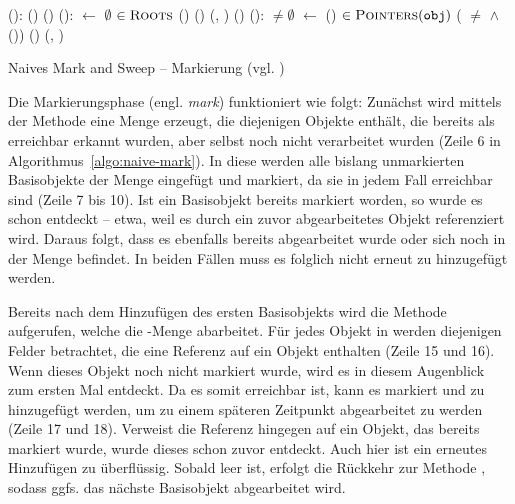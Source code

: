 \begin{algorithm}
\begin{algorithmic}[1]
	\State {}():
	\State \quad {}()
	\State \quad {}()
	\State
	\State {}():
	\State \quad {} $\gets$ $\emptyset$				
	\State \quad \FOREACH {} $\in \textsc{Roots}$		
	\State \quad \quad \IF {}()
	\State \quad \quad \quad {}()	
	\State \quad \quad \quad {}(, )	
	\State \quad \quad \quad {}()			
	\State
	\State {}():
	\State \quad \WHILE {} $\neq \emptyset$
	\State \quad \quad {} $\gets$ ()			
	\State \quad \quad \FOREACH {} $\in \textsc{Pointers}(\texttt{obj})$	
	\State \quad \quad \quad \IF ( $\neq$ \Null $\wedge$ ())	
	\State \quad \quad \quad \quad {}()	
	\State \quad \quad \quad \quad {}(, )
\end{algorithmic}
\caption[Naives Mark and Sweep -- Markierung]{Naives Mark and Sweep -- Markierung (vgl. \cite[Kap. 2.2]{jones-lins})}
\label{algo:naive-mark}
\end{algorithm}

Die Markierungsphase (engl. \textit{mark}) funktioniert wie folgt:
Zunächst wird mittels der Methode  eine Menge  erzeugt, die diejenigen Objekte enthält, die bereits als erreichbar erkannt wurden, aber selbst noch nicht verarbeitet wurden (Zeile 6 in Algorithmus~\ref{algo:naive-mark}).
In diese werden alle bislang unmarkierten Basisobjekte der Menge \Roots eingefügt und markiert, da sie in jedem Fall erreichbar sind (Zeile 7 bis 10).
Ist ein Basisobjekt bereits markiert worden, so wurde es schon entdeckt -- etwa, weil es durch ein zuvor abgearbeitetes Objekt referenziert wird.
Daraus folgt, dass es ebenfalls bereits abgearbeitet wurde oder sich noch in der Menge  befindet.
In beiden Fällen muss es folglich nicht erneut zu  hinzugefügt werden.

Bereits nach dem Hinzufügen des ersten Basisobjekts wird die Methode  aufgerufen, welche die -Menge abarbeitet.
Für jedes Objekt in  werden diejenigen Felder betrachtet, die eine Referenz auf ein Objekt enthalten (Zeile 15 und 16).
Wenn dieses Objekt noch nicht markiert wurde, wird es in diesem Augenblick zum ersten Mal entdeckt.
Da es somit erreichbar ist, kann es markiert und zu  hinzugefügt werden, um zu einem späteren Zeitpunkt abgearbeitet zu werden (Zeile 17 und 18).
Verweist die Referenz hingegen auf ein Objekt, das bereits markiert wurde, wurde dieses schon zuvor entdeckt.
Auch hier ist ein erneutes Hinzufügen zu  überflüssig.
Sobald  leer ist, erfolgt die Rückkehr zur Methode , sodass ggfs. das nächste Basisobjekt abgearbeitet wird.

